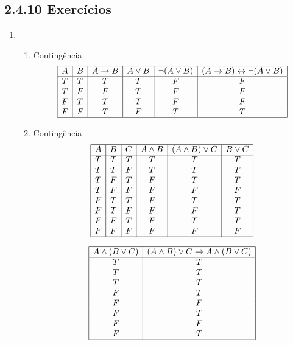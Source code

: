 \subsection{2.4.10 Exerc\'icios}


	\begin{enumerate}
	
	
			\item
			\begin{enumerate}
			
			\item Conting\^encia	
			\[\begin{array}{|c|c|c|c|c|c|}
			\hline
			 A & B & A \to B & A \lor B & \neg(A \lor B)& (A \to B) \leftrightarrow \neg(A \lor B) \\ \hline
			T & T & T & T & F & F \\
			T & F & F & T & F & F \\
			F & T & T & T & F & F \\
			F & F & T & F & T & T \\
			\hline
			\end{array}
			\]	
			
			
			\item Conting\^encia		
			\[\begin{array}{|c|c|c|c|c|c|}
			\hline
			A & B & C & A \land B & (A \land B) \lor C & B \lor C \\ \hline
			T & T & T & T & T & T \\
			T & T & F & T & T & T \\
			T & F & T & F & T & T \\
			T & F & F & F & F & F \\
			F & T & T & F & T & T \\
			F & T & F & F & F & T \\
			F & F & T & F & T & T \\
			F & F & F & F & F & F \\
			\hline
			\end{array}
			\]
			
			\[\begin{array}{|c|c|}
			\hline
			A \land (B \lor C) & (A \land B) \lor C \to A \land (B \lor C)  \\ \hline
			T & T \\
			T & T \\
			T & T \\
			F & T \\
			F & F \\
			F & T \\
			F & F \\
			F & T \\
			\hline
			\end{array}
			\]
			

\end{enumerate}
\end{enumerate}
